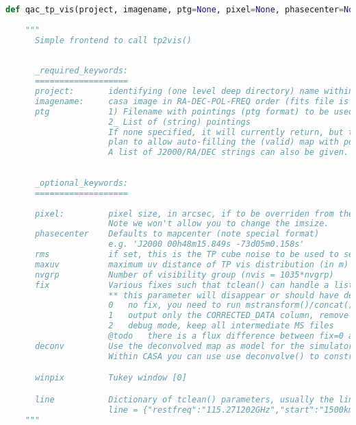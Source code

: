 \documentclass[12pt,a4paper]{article}
\begin{document}
\begin{lstlisting}[language=Python]
def qac_tp_vis(project, imagename, ptg=None, pixel=None, phasecenter=None, rms=None, maxuv=10.0, nvgrp=4, fix=1, deconv=True, winpix=0, **line):    
           
    """
      Simple frontend to call tp2vis() 
    
    
      _required_keywords:
      ===================
      project:       identifying (one level deep directory) name within which all files are places
      imagename:     casa image in RA-DEC-POL-FREQ order (fits file is ok too)
      ptg            1) Filename with pointings (ptg format) to be used
                     2_ List of (string) pointings
                     If none specified, it will currently return, but there may be a
                     plan to allow auto-filling the (valid) map with pointings.
                     A list of J2000/RA/DEC strings can also be given.
    
    
      _optional_keywords:
      ===================
    
      pixel:         pixel size, in arcsec, if to be overriden from the input map. Default: None
                     Note we won't allow you to change the imsize.
      phasecenter    Defaults to mapcenter (note special format)
                     e.g. 'J2000 00h48m15.849s -73d05m0.158s'
      rms            if set, this is the TP cube noise to be used to set the weights
      maxuv          maximum uv distance of TP vis distribution (in m)  [10m] 
      nvgrp          Number of visibility group (nvis = 1035*nvgrp)
      fix            Various fixes such that tclean() can handle a list of ms.
                     ** this parameter will disappear or should have default 1
                     0   no fix, you need to run mstransform()/concat() on the tp.ms
                     1   output only the CORRECTED_DATA column, remove other *DATA*, POINTING table also removed
                     2   debug mode, keep all intermediate MS files
                     @todo   there is a flux difference between fix=0 and fix=1 in dirtymap
      deconv         Use the deconvolved map as model for the simulator
                     Within CASA you can use use deconvolve() to construct a Jy/pixel map.

      winpix         Tukey window [0]

      line           Dictionary of tclean() parameters, usually the line parameters are useful, e.g.
                     line = {"restfreq":"115.271202GHz","start":"1500km/s", "width":"5km/s","nchan":5}
    """
\end{lstlisting}
\end{document}
